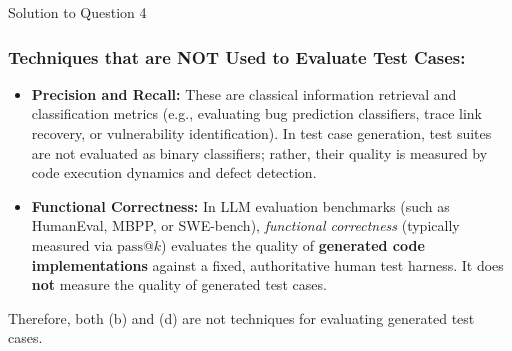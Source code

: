 \documentclass[11pt,a4paper]{article}
\begin{document}
\begin{solutionbox}{Solution to Question 4}
\subsubsection*{Techniques that are NOT Used to Evaluate Test Cases:}
\begin{itemize}[leftmargin=1.5cm]
    \item[\textbf{(b)}] \textbf{Precision and Recall:} These are classical information retrieval and classification metrics (e.g., evaluating bug prediction classifiers, trace link recovery, or vulnerability identification). In test case generation, test suites are not evaluated as binary classifiers; rather, their quality is measured by code execution dynamics and defect detection.
    \item[\textbf{(d)}] \textbf{Functional Correctness:} In LLM evaluation benchmarks (such as HumanEval, MBPP, or SWE-bench), \textit{functional correctness} (typically measured via $\text{pass}@k$) evaluates the quality of \textbf{generated code implementations} against a fixed, authoritative human test harness. It does \textbf{not} measure the quality of generated test cases.
\end{itemize}
Therefore, both (b) and (d) are not techniques for evaluating generated test cases.
\end{solutionbox}

\bigskip
\end{document}
